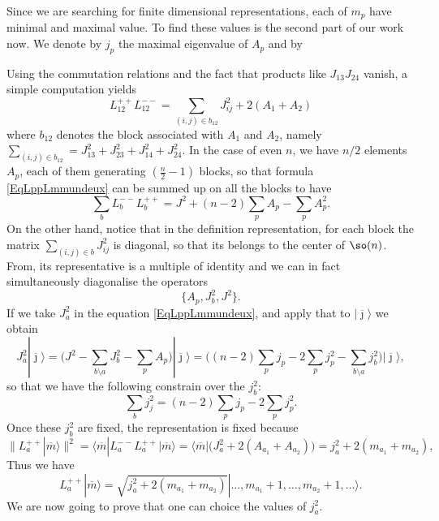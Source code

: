 Since we are searching for finite dimensional representations, each of $m_p$ have minimal and maximal value. To find these values is the second part of our work now. We denote by $j_p$ the maximal eigenvalue of $A_p$ and by

Using the commutation relations and the fact that products like $J_{13}J_{24}$ vanish, a simple computation yields
\begin{equation}	\label{EqLppLmmundeux}
	L_{12}^{++}L_{12}^{--}=\sum_{(i,j)\in b_{12}} J_{ij}^2+2(A_1+A_2)
\end{equation}
where $b_{12}$ denotes the block associated with $A_1$ and $A_2$, namely $\sum_{(i,j)\in b_{12}}=J_{13}^2+J_{23}^2+J_{14}^2+J_{24}^2$. In the case of even $n$, we have $n/2$ elements $A_p$, each of them generating $(\frac{ n }{ 2 }-1)$ blocks, so that formula \eqref{EqLppLmmundeux} can be summed up on all the blocks to have
\begin{equation}
	\sum_{b}L_b^{--}L_b^{++}=J^2+(n-2)\sum_pA_p-\sum_pA_p^2.
\end{equation}
On the other hand, notice that in the definition representation, for each block the matrix $\sum_{(i,j)\in b}J_{ij}^2$ is diagonal, so that its belongs to the center of $\so(n)$. From, its representative is a multiple of identity and we can in fact simultaneously diagonalise the operators
\begin{equation}
	\{ A_p,J_b^2,J^2 \}.
\end{equation}
If we take $J_a^2$ in the equation \eqref{EqLppLmmundeux}, and apply that to $| \overline{ \jmath } \rangle$ we obtain
\begin{equation}
	J_a^2| \overline{ \jmath } \rangle	=\Big( J^2-\sum_{b\setminus a}J_b^2-\sum_pA_p \Big)| \overline{ \jmath } \rangle
	=\Big( (n-2)\sum_pj_p-2\sum_pj_p^2-\sum_{b\setminus a}j_b^2 \Big)| \overline{ \jmath } \rangle,
\end{equation}
so that we have the following constrain over the $j_b^2$:
\begin{equation}		\label{EqCondCompajsqsumjdeux}
	\sum_bj_j^2=(n-2)\sum_pj_p-2\sum_pj_p^2.
\end{equation}
Once these $j_b^2$ are fixed, the representation is fixed because
\begin{equation}
	\| L_a^{++}| \overline{ m } \rangle \|^2=\langle\overline{ m }| L_a^{--}L_a^{++} | \overline{ m } \rangle=\langle \overline{ m }| \big( J_a^2+2(A_{a_1}+A_{a_2}) \big)=j_a^2+2(m_{a_1}+m_{a_2}),
\end{equation}
Thus we have
\begin{equation}			\label{EqLppketmsqrtjjjldots}
	L_a^{++}| \overline{ m } \rangle=\sqrt{  j_a^2+2(m_{a_1}+m_{a_2})  }| \ldots,m_{a_1}+1,\ldots,m_{a_2}+1,\ldots \rangle.
\end{equation}
We are now going to prove that one can choice the values of $j_a^2$.

